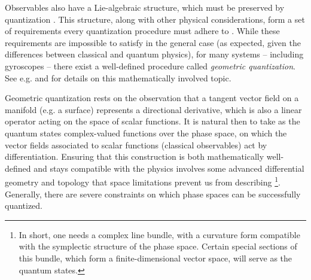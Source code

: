 \documentclass[final,3p,mathptmx]{elsarticle}
\begin{document}
\endgroup

Observables also have a Lie-algebraic structure, which must be preserved by quantization \cite{nlab2016quantization}. This structure, along with other physical considerations, form a set of requirements every quantization procedure must adhere to \cite{todorov2012quantization}. While these requirements are impossible to satisfy in the general case (as expected, given the differences between classical and quantum physics), for many systems -- including gyroscopes -- there exist a well-defined procedure called \textit{geometric quantization}. See e.g. \cite[Ch. 22-23]{hall2013quantum} and \cite{blau1992symplectic} for details on this mathematically involved topic.

Geometric quantization rests on the observation that a tangent vector field on a manifold (e.g. a surface) represents a directional derivative, which is also a linear operator acting on the space of scalar functions. It is natural then to take as the quantum states  complex-valued functions over the phase space, on which the vector fields associated to scalar functions (classical observables) act by differentiation. Ensuring that this construction is both mathematically well-defined and stays compatible with the physics involves some advanced differential geometry and topology that space limitations prevent us from describing \footnote{In short, one needs a complex line bundle, with a curvature form compatible with the symplectic structure of the phase space. Certain special sections of this bundle, which form a finite-dimensional vector space, will serve as the quantum states.}. Generally, there are severe constraints on which phase spaces can be successfully quantized.  
\end{document}

